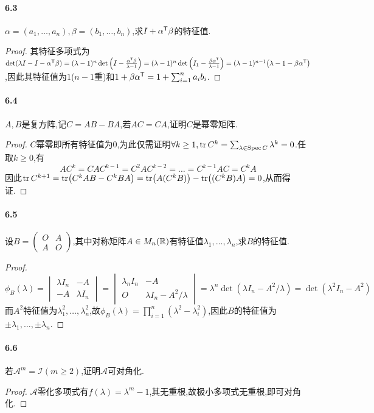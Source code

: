 \documentclass[11pt]{article}
\begin{document}
\paragraph{6.3}$\alpha=(a_1,\dots,a_n),\beta=(b_1,\dots,b_n)$,求$I+\alpha^{\mathsf{T}}\beta$的特征值.
\begin{proof}
    其特征多项式为$\det(\lambda I-I-\alpha^{\mathsf{T}}\beta)=(\lambda-1)^n \det\left(I-\frac{\alpha^{\mathsf{T}}\beta}{\lambda-1}\right)=(\lambda-1)^n \det\left(I_1-\frac{\beta\alpha^{\mathsf{T}}}{\lambda-1}\right)=(\lambda-1)^{n-1}\!\left(\lambda-1-\beta\alpha^{\mathsf{T}}\right)$,因此其特征值为$1$($n-1$重)和$1+\beta\alpha^{\mathsf{T}}=1+\sum_{i=1}^n a_ib_i$.
\end{proof}
\paragraph{6.4}$A,B$是复方阵,记$C=AB-BA$,若$AC=CA$,证明$C$是幂零矩阵.
\begin{proof}
    $C$幂零即所有特征值为0,为此仅需证明$\forall k\geq 1, \operatorname{tr} C^k=\sum_{\lambda\in \operatorname{Spec} C}\lambda^k=0$.任取$k\geq 0$,有
    $$AC^k=CAC^{k-1}=C^2AC^{k-2}=\dots=C^{k-1}AC=C^kA$$
    因此$\operatorname{tr} C^{k+1}=\operatorname{tr}\!\left(C^kAB-C^kBA\right)=\operatorname{tr}\!\left(A(C^kB)\right)-\operatorname{tr}\!\left((C^kB)A\right)=0$,从而得证.
\end{proof}
\paragraph{6.5}设$B=\begin{pmatrix}
    O&A\\ A&O
\end{pmatrix}$,其中对称矩阵$A\in M_n(\mathbb{R})$有特征值$\lambda_1,\dots,\lambda_n$,求$B$的特征值.
\begin{proof}
    $$\phi_B(\lambda)=\begin{vmatrix}
        \lambda I_n & -A \\
        -A & \lambda I_n
    \end{vmatrix}=\begin{vmatrix}
        \lambda_n I_n & -A\\
        O & \lambda I_n - A^2/\lambda
    \end{vmatrix}=\lambda^n \det(\lambda I_n-A^2/\lambda)=\det(\lambda^2 I_n-A^2)$$
    而$A^2$特征值为$\lambda_1^2,\dots,\lambda_n^2$,故$\phi_B(\lambda)=\prod_{i=1}^{n}(\lambda^2-\lambda_i^2)$,因此$B$的特征值为$\pm \lambda_1,\dots,\pm \lambda_n$.
\end{proof}
\paragraph{6.6}若$\mathscr{A}^m=\mathscr{I} (m\geq 2)$,证明$\mathscr{A}$可对角化.
\begin{proof}
    $\mathscr{A}$零化多项式有$f(\lambda)=\lambda^m-1$,其无重根,故极小多项式无重根,即可对角化.
\end{proof}
\end{document}
